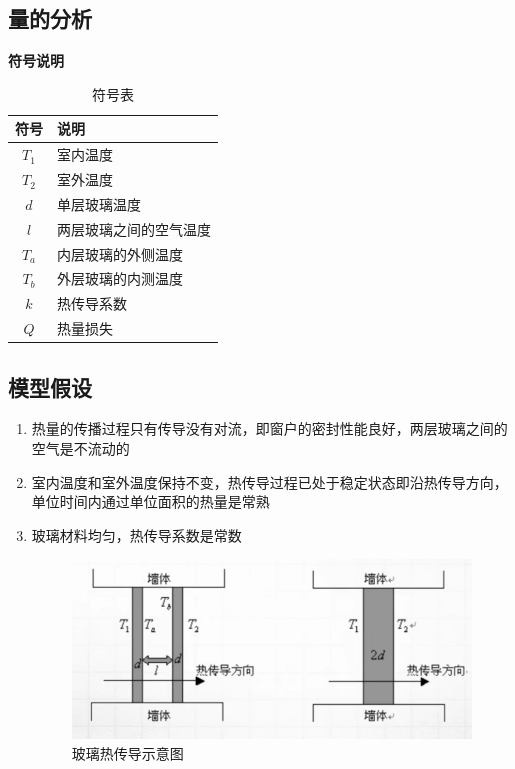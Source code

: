 \documentclass[openany]{progbookcn}
\begin{document}
\subsection{量的分析}
\noindent\textbf{符号说明}
\begin{table}[htbp]
\centering
\caption{符号表}
\begin{tabular}{|c|l|}
\hline
符号 & 说明 \\
\hline
{$T_1$} & 室内温度\\
{$T_2$} & 室外温度\\
{$d$} & 单层玻璃温度\\
{$l$} & 两层玻璃之间的空气温度\\
{$T_a$} & 内层玻璃的外侧温度\\
{$T_b$} & 外层玻璃的内测温度\\
{$k$} & 热传导系数\\
{$Q$} &热量损失\\
\hline 
\end{tabular}
\end{table}
\subsection{模型假设}
\begin{enumerate}
\item 热量的传播过程只有传导没有对流，即窗户的密封性能良好，两层玻璃之间的空气是不流动的
\item 室内温度和室外温度保持不变，热传导过程已处于稳定状态即沿热传导方向，单位时间内通过单位面积的热量是常熟
\item 玻璃材料均匀，热传导系数是常数
\begin{figure}[H]
\centering
\includegraphics[width=0.6 \textwidth]{figs/chapter3/玻璃热传导示意图}
\caption{玻璃热传导示意图}
\end{figure}
\end{enumerate}
\end{document}
